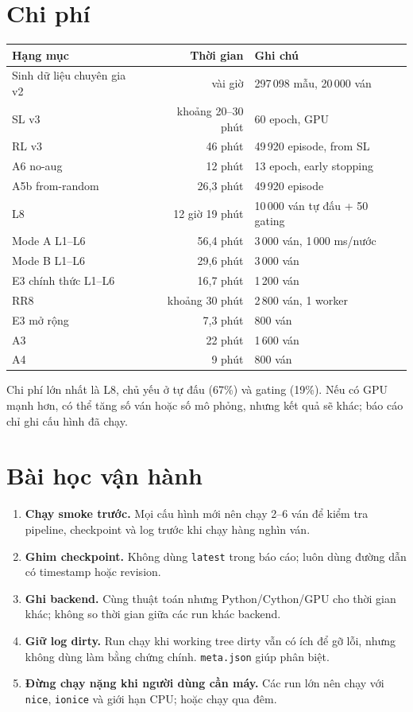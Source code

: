 \section{Chi phí}
\begin{center}\small
\begin{tabularx}{\textwidth}{@{}l r X@{}}
\toprule
\textbf{Hạng mục} & \textbf{Thời gian} & \textbf{Ghi chú} \\
\midrule
Sinh dữ liệu chuyên gia v2 & vài giờ & 297\,098 mẫu, 20\,000 ván \\
SL v3 & khoảng 20--30 phút & 60 epoch, GPU \\
RL v3 & 46 phút & 49\,920 episode, from SL \\
A6 no-aug & ~12 phút & 13 epoch, early stopping \\
A5b from-random & 26,3 phút & 49\,920 episode \\
L8 & 12 giờ 19 phút & 10\,000 ván tự đấu + 50 gating \\
Mode A L1--L6 & 56,4 phút & 3\,000 ván, 1\,000 ms/nước \\
Mode B L1--L6 & 29,6 phút & 3\,000 ván \\
E3 chính thức L1--L6 & 16,7 phút & 1\,200 ván \\
RR8 & khoảng 30 phút & 2\,800 ván, 1 worker \\
E3 mở rộng & 7,3 phút & 800 ván \\
A3 & 22 phút & 1\,600 ván \\
A4 & 9 phút & 800 ván \\
\bottomrule
\end{tabularx}
\end{center}
Chi phí lớn nhất là L8, chủ yếu ở tự đấu (67\%) và gating (19\%). Nếu có GPU mạnh hơn, có thể
tăng số ván hoặc số mô phỏng, nhưng kết quả sẽ khác; báo cáo chỉ ghi cấu hình đã chạy.

\section{Bài học vận hành}
\begin{enumerate}
  \item \textbf{Chạy smoke trước.} Mọi cấu hình mới nên chạy 2--6 ván để kiểm tra pipeline,
        checkpoint và log trước khi chạy hàng nghìn ván.
  \item \textbf{Ghim checkpoint.} Không dùng \texttt{latest} trong báo cáo; luôn dùng đường dẫn
        có timestamp hoặc revision.
  \item \textbf{Ghi backend.} Cùng thuật toán nhưng Python/Cython/GPU cho thời gian khác; không
        so thời gian giữa các run khác backend.
  \item \textbf{Giữ log dirty.} Run chạy khi working tree dirty vẫn có ích để gỡ lỗi, nhưng
        không dùng làm bằng chứng chính. \texttt{meta.json} giúp phân biệt.
  \item \textbf{Đừng chạy nặng khi người dùng cần máy.} Các run lớn nên chạy với \texttt{nice},
        \texttt{ionice} và giới hạn CPU; hoặc chạy qua đêm.
\end{enumerate}